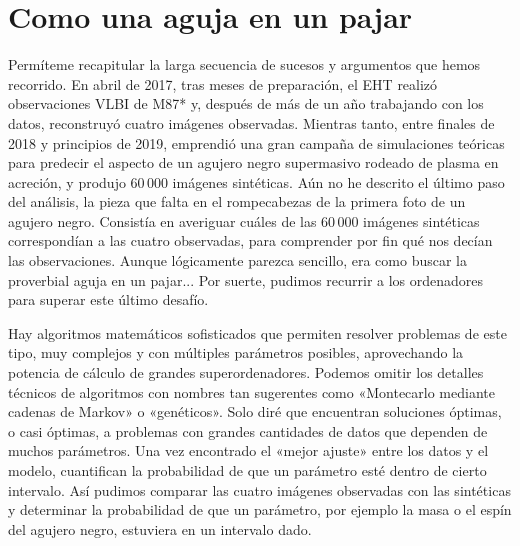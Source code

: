 \section{Como una aguja en un pajar}\label{sec:07-needle}

Permíteme recapitular la larga secuencia de sucesos y argumentos que hemos recorrido. En abril de 2017, tras meses de preparación, el EHT realizó observaciones VLBI de M87* y, después de más de un año trabajando con los datos, reconstruyó cuatro imágenes observadas. Mientras tanto, entre finales de 2018 y principios de 2019, emprendió una gran campaña de simulaciones teóricas para predecir el aspecto de un agujero negro supermasivo rodeado de plasma en acreción, y produjo 60\,000 imágenes sintéticas. Aún no he descrito el último paso del análisis, la pieza que falta en el rompecabezas de la primera foto de un agujero negro. Consistía en averiguar cuáles de las 60\,000 imágenes sintéticas correspondían a las cuatro observadas, para comprender por fin qué nos decían las observaciones. Aunque lógicamente parezca sencillo, era como buscar la proverbial aguja en un pajar... Por suerte, pudimos recurrir a los ordenadores para superar este último desafío.

Hay algoritmos matemáticos sofisticados que permiten resolver problemas de este tipo, muy complejos y con múltiples parámetros posibles, aprovechando la potencia de cálculo de grandes superordenadores. Podemos omitir los detalles técnicos de algoritmos con nombres tan sugerentes como «Montecarlo mediante cadenas de Markov» o «genéticos». Solo diré que encuentran soluciones óptimas, o casi óptimas, a problemas con grandes cantidades de datos que dependen de muchos parámetros. Una vez encontrado el «mejor ajuste» entre los datos y el modelo, cuantifican la probabilidad de que un parámetro esté dentro de cierto intervalo. Así pudimos comparar las cuatro imágenes observadas con las sintéticas y determinar la probabilidad de que un parámetro, por ejemplo la masa o el espín del agujero negro, estuviera en un intervalo dado.

